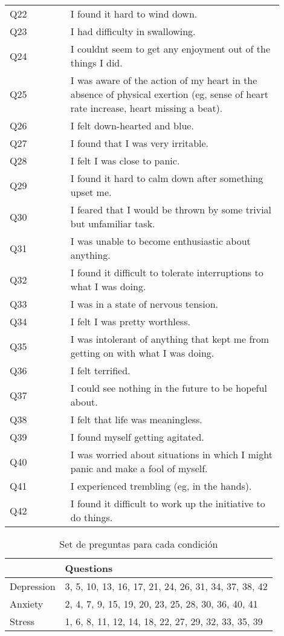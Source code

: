 \begin{appendices}
\begin{table}[ht]
\begin{tabular}{p{0.2\linewidth} | p{0.7\linewidth}}
 Q22 &  I found it hard to wind down. \\
 Q23 &  I had difficulty in swallowing. \\
 Q24 &  I couldnt seem to get any enjoyment out of the things I did. \\
 Q25 &  I was aware of the action of my heart in the absence of physical exertion (eg, sense of heart rate increase, heart missing a beat). \\
 Q26 &  I felt down-hearted and blue. \\
 Q27 &  I found that I was very irritable. \\
 Q28 &  I felt I was close to panic. \\
 Q29 &  I found it hard to calm down after something upset me. \\
 Q30 &  I feared that I would be thrown by some trivial but unfamiliar task. \\
 Q31 &  I was unable to become enthusiastic about anything. \\
 Q32 &  I found it difficult to tolerate interruptions to what I was doing. \\
 Q33 &  I was in a state of nervous tension. \\
 Q34 &  I felt I was pretty worthless. \\
 Q35 &  I was intolerant of anything that kept me from getting on with what I was doing. \\
 Q36 &  I felt terrified. \\
 Q37 &  I could see nothing in the future to be hopeful about. \\
 Q38 &  I felt that life was meaningless. \\
 Q39 &  I found myself getting agitated. \\
 Q40 &  I was worried about situations in which I might panic and make a fool of myself. \\
 Q41 &  I experienced trembling (eg, in the hands). \\
 Q42 &  I found it difficult to work up the initiative to do things. \\
\bottomrule
\end{tabular}
\label{table:test_questions}
\end{table}%

\begin{table}[ht]
\centering
\caption{Set de preguntas para cada condición}
\begin{tabular}{ll}
\toprule
{} &                                             Questions \\
\midrule
Depression &  3, 5, 10, 13, 16, 17, 21, 24, 26, 31, 34, 37, 38, 42 \\
Anxiety    &  2, 4, 7, 9, 15, 19, 20, 23, 25, 28, 30, 36, 40, 41 \\
Stress     &  1, 6, 8, 11, 12, 14, 18, 22, 27, 29, 32, 33, 35, 39 \\
\bottomrule
\end{tabular}
\label{table:questions_condition}
\end{table}%


\end{appendices}
